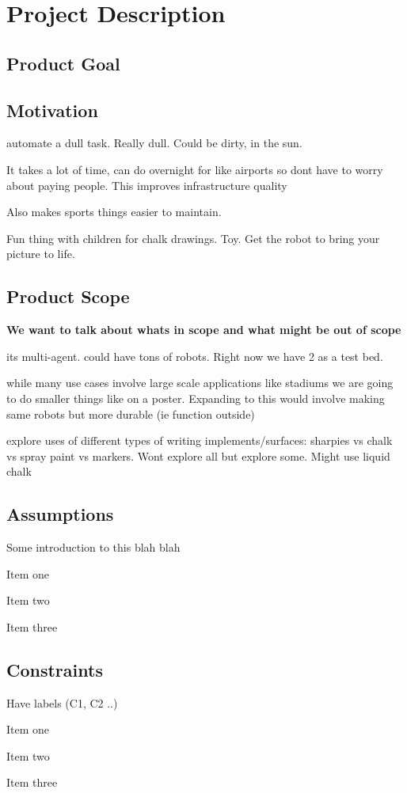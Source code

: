 
\section{Project Description}
\label{sec:project_description}

\subsection{Product Goal}


\subsection{Motivation}
automate a dull task. Really dull. Could be dirty, in the sun. 

It takes a lot of time, can do overnight for like airports so dont have to worry about paying people. This improves infrastructure quality

Also makes sports things easier to maintain.

Fun thing with children for chalk drawings. Toy. Get the robot to bring your picture to life. 

\subsection{Product Scope}
\textbf{We want to talk about whats in scope and what might be out of scope}

its multi-agent. could have tons of robots. Right now we have 2 as a test bed. 

while many use cases involve large scale applications like stadiums we are going to do smaller things like on a poster. Expanding to this would involve making same robots but more durable (ie function outside)

explore uses of different types of writing implements/surfaces: sharpies vs chalk vs spray paint vs markers. Wont explore all but explore some. Might use liquid chalk

\subsection{Assumptions}
Some introduction to this blah blah
\begin{list}{A:~}{}
\item Item one
\item Item two
\item Item three
\end{list}

\subsection{Constraints}
Have labels (C1, C2 ..)
\begin{list}{C:~}{}
\item Item one
\item Item two
\item Item three
\end{list}